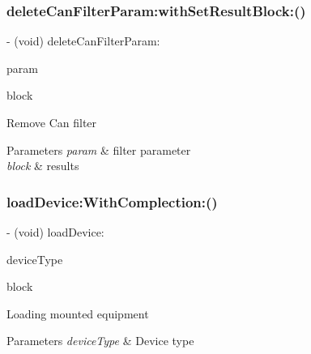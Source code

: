 \subsubsection{\texorpdfstring{delete\+Can\+Filter\+Param\+:with\+Set\+Result\+Block\+:()}{deleteCanFilterParam:withSetResultBlock:()}}
{\footnotesize\ttfamily -\/ (void) delete\+Can\+Filter\+Param\+: \begin{DoxyParamCaption}\item[{(\hyperlink{struct_p_v_s_d_k___m_o_u_n_t_a_p_i___d_e_l___c_a_n___f_i_l_t_e_r}{P\+V\+S\+D\+K\+\_\+\+M\+O\+U\+N\+T\+A\+P\+I\+\_\+\+D\+E\+L\+\_\+\+C\+A\+N\+\_\+\+F\+I\+L\+T\+ER})}]{param }\item[{withSetResultBlock:(P\+V\+Set\+Can\+Filter\+Param\+Result\+Block)}]{block }\end{DoxyParamCaption}}

Remove Can filter


\begin{DoxyParams}{Parameters}
{\em param} & filter parameter \\
\hline
{\em block} & results \\
\hline
\end{DoxyParams}
\mbox{\label{interface_p_v_mount_controller_a43ef148cab654a129594092645d7ca6e}} 
\subsubsection{\texorpdfstring{load\+Device\+:\+With\+Complection\+:()}{loadDevice:WithComplection:()}}
{\footnotesize\ttfamily -\/ (void) load\+Device\+: \begin{DoxyParamCaption}\item[{(\hyperlink{group___p_v_s_d_k___c_o_r_e___a_p_i___m_o_u_n_t_c_o_n_t_r_o_l_ga23d329e18c5af08ae082601596435dad}{P\+V\+Mount\+Port\+Type})}]{device\+Type }\item[{WithComplection:(P\+V\+Load\+Device\+Result\+Block)}]{block }\end{DoxyParamCaption}}

Loading mounted equipment


\begin{DoxyParams}{Parameters}
{\em device\+Type} & Device type \\
\hline
\end{DoxyParams}
\mbox{\label{interface_p_v_mount_controller_ab831b53729929aab50c09bee7d482e46}} 
